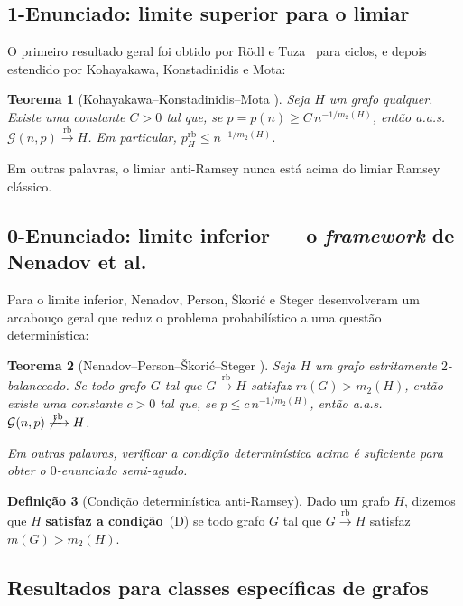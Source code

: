 \documentclass[reqno, 12pt]{amsart}
\numberwithin{equation}{section}
\theoremstyle{plain}
\newtheorem{theorem}{Teorema}[section]
\theoremstyle{definition}
\newtheorem{definition}[theorem]{Definição}
\newcommand{\Gnp}{\mathcal{G}(n,p)}
\newcommand{\rb}{\xrightarrow{\,\mathrm{rb}\,}}
\newcommand{\mdens}{m_2}
\newcommand{\maxdens}{m}
\newcommand{\whp}{a.a.s.}
\begin{document}
\subsection{1-Enunciado: limite superior para o limiar}

O primeiro resultado geral foi obtido por Rödl e Tuza~\cite{rodl1992rainbow}
para ciclos, e depois estendido por Kohayakawa, Konstadinidis e Mota:

\begin{theorem}[Kohayakawa--Konstadinidis--Mota \cite{kohayakawa2014anti}]
    \label{thm:1statement}
    Seja $H$ um grafo qualquer. Existe uma constante $C > 0$ tal que,
    se $p = p(n) \ge C\, n^{-1/\mdens(H)}$, então \whp\
    $\Gnp \rb H$.
    Em particular, $p_H^{\mathrm{rb}} \le n^{-1/\mdens(H)}$.
\end{theorem}

Em outras palavras, o limiar anti-Ramsey nunca está acima do limiar Ramsey clássico.

\subsection{0-Enunciado: limite inferior — o \emph{framework} de Nenadov et al.}

Para o limite inferior, Nenadov, Person, Škorić e Steger desenvolveram um
arcabouço geral que reduz o problema probabilístico a uma questão determinística:

\begin{theorem}[Nenadov--Person--Škorić--Steger \cite{nenadov2017algorithmic}]
    \label{thm:framework}
    Seja $H$ um grafo estritamente $2$-balanceado.
    Se todo grafo $G$ tal que $G \rb H$ satisfaz $\maxdens(G) > \mdens(H)$,
    então existe uma constante $c > 0$ tal que, se $p \le c\, n^{-1/\mdens(H)}$,
    então \whp\ $\Gnp \not\rb H$.

    Em outras palavras, verificar a condição determinística acima
    é suficiente para obter o $0$-enunciado semi-agudo.
\end{theorem}

\begin{definition}[Condição determinística anti-Ramsey]
    \label{def:cond-det}
    Dado um grafo $H$, dizemos que $H$ \textbf{satisfaz a condição}~(D)
    se todo grafo $G$ tal que $G \rb H$ satisfaz $\maxdens(G) > \mdens(H)$.
\end{definition}

\subsection{Resultados para classes específicas de grafos}
\end{document}
